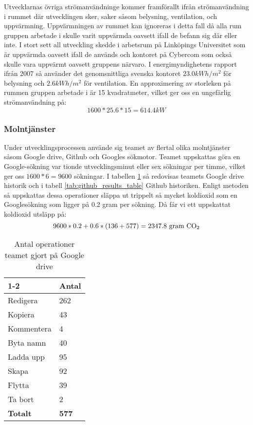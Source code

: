 Utvecklarnas övriga strömanvändninge kommer framförallt ifrån strömanvändning i rummet där utvecklingen sker, saker såsom belysning, ventilation, och uppvärmning. Uppvärmningen av rummet kan ignoreras i detta fall då alla rum gruppen arbetade i skulle varit uppvärmda oavsett ifall de befann sig där eller inte. I stort sett all utveckling skedde i arbetsrum på Linköpings Universitet som är uppvärmda oavsett ifall de används och kontoret på Cybercom som också skulle vara uppvärmt oavsett gruppens närvaro. I energimyndighetens rapport ifrån 2007\cite{emynd} så använder det genomsnittliga svenska kontoret $23.0kWh/m^2$ för belysning och $2.6kWh/m^2$ för ventilation. En approximering av storleken på rummen gruppen arbetade i är 15 kvadratmeter, vilket ger oss en ungefärlig strömanvändning på: $$1600 * 25.6 * 15 = 614.4kW$$

\subsubsection{Molntjänster}
Under utvecklingsprocessen använde sig teamet av flertal olika molntjänster såsom Google drive, Github och Googles sökmotor. Teamet uppskattas göra en Google-sökning var tionde utvecklingsminut eller sex sökningar per timme, vilket ger oss $1600 * 6 = 9600$ sökningar. I tabellen \ref{tab:drive_results_table} så redovisas teamets Google drive historik och i tabell \ref{tab:github_results_table} Github historiken. Enligt metoden så uppskattas dessa operationer släppa ut trippelt så mycket koldioxid som en Googlesökning som ligger på 0.2 gram per sökning\cite{google-blog}. Då får vi ett uppskattat koldioxid utsläpp på: $$9600 * 0.2 + 0.6 * (136 + 577) = 2347.8\text{ gram \ce{CO2}}$$



\begin{table}
	\centering
	\begin{tabular}{| l | l |}
		\cline{1-2}
		\multicolumn{1}{| c |}{\textbf{Operation}} & \textbf{Antal}  \\ \hline
		Redigera & 262 \\ \hline
		Kopiera & 43 \\ \hline
		Kommentera & 4 \\ \hline
		Byta namn & 40 \\ \hline
		Ladda upp & 95 \\ \hline
		Skapa & 92 \\ \hline
		Flytta & 39 \\ \hline
		Ta bort & 2 \\ \hline
		\textbf{Totalt} & \textbf{577}\\ \hline
	\end{tabular}
	\caption{Antal operationer teamet gjort på Google drive}
	\label{tab:drive_results_table}
\end{table}



